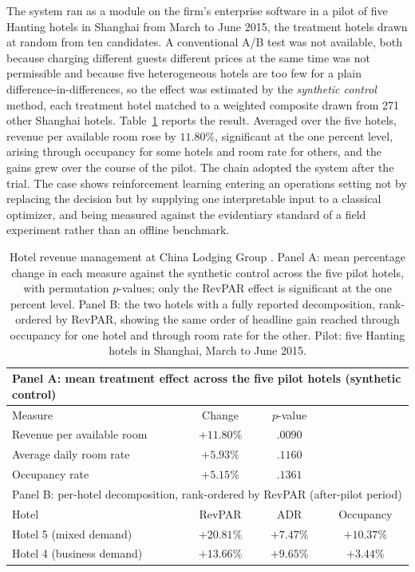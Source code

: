 The system ran as a module on the firm's enterprise software in a pilot of five Hanting hotels in Shanghai from March to June 2015, the treatment hotels drawn at random from ten candidates. A conventional A/B test was not available, both because charging different guests different prices at the same time was not permissible and because five heterogeneous hotels are too few for a plain difference-in-differences, so the effect was estimated by the \emph{synthetic control} method, each treatment hotel matched to a weighted composite drawn from 271 other Shanghai hotels. Table~\ref{tab:hotel_results} reports the result. Averaged over the five hotels, revenue per available room rose by $11.80\%$, significant at the one percent level, arising through occupancy for some hotels and room rate for others, and the gains grew over the course of the pilot. The chain adopted the system after the trial. The case shows reinforcement learning entering an operations setting not by replacing the decision but by supplying one interpretable input to a classical optimizer, and being measured against the evidentiary standard of a field experiment rather than an offline benchmark.

\begin{table}[t]
\centering
\small
\begin{tabular}{lccc}
\toprule
\multicolumn{4}{l}{Panel A: mean treatment effect across the five pilot hotels (synthetic control)} \\
\midrule
Measure & Change & $p$-value \\
\midrule
Revenue per available room & $+11.80\%$ & $.0090$ \\
Average daily room rate & $+5.93\%$ & $.1160$ \\
Occupancy rate & $+5.15\%$ & $.1361$ \\
\midrule
\multicolumn{4}{l}{Panel B: per-hotel decomposition, rank-ordered by RevPAR (after-pilot period)} \\
\midrule
Hotel & RevPAR & ADR & Occupancy \\
\midrule
Hotel 5 (mixed demand) & $+20.81\%$ & $+7.47\%$ & $+10.37\%$ \\
Hotel 4 (business demand) & $+13.66\%$ & $+9.65\%$ & $+3.44\%$ \\
\bottomrule
\end{tabular}
\caption{Hotel revenue management at China Lodging Group \citep{Chen2023hotelrl}. Panel A: mean percentage change in each measure against the synthetic control across the five pilot hotels, with permutation $p$-values; only the RevPAR effect is significant at the one percent level. Panel B: the two hotels with a fully reported decomposition, rank-ordered by RevPAR, showing the same order of headline gain reached through occupancy for one hotel and through room rate for the other. Pilot: five Hanting hotels in Shanghai, March to June 2015.}
\label{tab:hotel_results}
\end{table}

